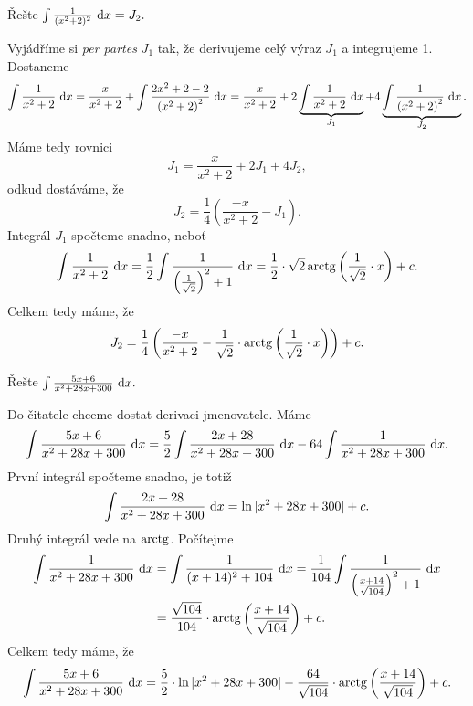 \begin{priklad}
Řešte $\int \frac{1}{(x^2+2)^2}\, \mathop{}\!\mathrm{d} x = J_2.$
\end{priklad}

\begin{reseni}
Vyjádříme si \textit{per partes} $J_1$ tak, že derivujeme celý výraz $J_1$ a integrujeme
1. Dostaneme
$$
    \int \frac{1}{x^2 + 2} \, \mathop{}\!\mathrm{d} x = \frac{x }{x^2 + 2} + \int \frac{2x ^2 +2 -2}{\left( x^2 + 2 \right )^2  } \, \mathop{}\!\mathrm{d} x = \frac{x }{x^2 + 2} + 2 \underbrace{\int \frac{1}{x^2+2}\, \mathop{}\!\mathrm{d} x}_{J_1} + 4 \underbrace{\int \frac{1}{\left( x^2 + 2 \right )^2 }\, \mathop{}\!\mathrm{d} x}_{J_2}.
$$
Máme tedy rovnici
$$
    J_1 = \frac{x }{x^2 + 2}+ 2J_1 +4J_2,
$$
odkud dostáváme, že
$$
    J_2 = \frac{1}{4} \left( \frac{-x }{x^2 + 2} -J_1 \right ) .
$$
Integrál $J_1$ spočteme snadno, neboť
$$
    \int \frac{1}{x^2+2}\, \mathop{}\!\mathrm{d} x = \frac{1}{2} \int \frac{1}{\left( \frac{1}{\sqrt{2}} \right )^2 + 1 } \, \mathop{}\!\mathrm{d} x = \frac{1}{2} \cdot \sqrt{2} \operatorname{arctg} \left( \frac{1}{\sqrt{2}}\cdot  x \right )+ c.
$$
Celkem tedy máme, že
$$
    J_2 = \frac{1}{4} \left( \frac{-x }{x^2 + 2} -\frac{1}{\sqrt{2}} \cdot \operatorname{arctg} \left( \frac{1}{\sqrt{2}} \cdot x \right ) \right ) +c .
$$
\end{reseni}

\begin{priklad}
Řešte $\int \frac{5x+6}{x^2+28x+300}\, \mathop{}\!\mathrm{d} x.$
\end{priklad}

\begin{reseni}
Do čitatele chceme dostat derivaci jmenovatele. Máme
$$
    \int \frac{5x+6}{x^2+28x+300}\, \mathop{}\!\mathrm{d} x = \frac{5}{2} \int \frac{2x + 28}{x^2 + 28x + 300}\, \mathop{}\!\mathrm{d} x -64 \int  \frac{1}{x^2 + 28 x + 300} \, \mathop{}\!\mathrm{d} x.
$$
První integrál spočteme snadno, je totiž
$$
    \int \frac{2x + 28}{x^2 + 28x + 300}\, \mathop{}\!\mathrm{d} x = \operatorname{ln} |x^2 + 28x + 300| + c.
$$
Druhý integrál vede na $\operatorname{arctg}$. Počítejme
\begin{align*}
	\int  \frac{1}{x^2 + 28 x + 300} \, \mathop{}\!\mathrm{d} x &= \int  \frac{1}{(x+14)^2 + 104} \, \mathop{}\!\mathrm{d} x = \frac{1}{104} \int \frac{1}{\left( \frac{x + 14}{\sqrt{104}} \right )^2 + 1 } \, \mathop{}\!\mathrm{d} x \\
	&= \frac{\sqrt{104}}{104} \cdot \operatorname{arctg} \left( \frac{x+14}{\sqrt{104}} \right ) + c.
\end{align*}
Celkem tedy máme, že
$$
    \int \frac{5x+6}{x^2+28x+300}\, \mathop{}\!\mathrm{d} x = \frac{5}{2} \cdot \operatorname{ln} |x^2 + 28x + 300| - \frac{64}{\sqrt{104}} \cdot \operatorname{arctg} \left( \frac{x+14}{\sqrt{104}} \right ) + c.
$$
\end{reseni}


